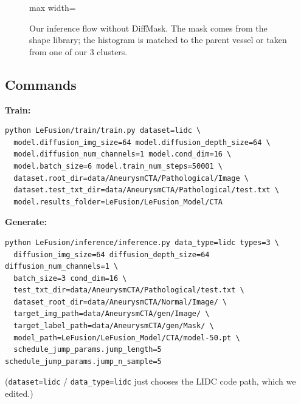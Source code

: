 \documentclass[11pt,a4paper]{article}
\newcommand{\x}{\bm{x}}
\begin{document}
\begin{figure}[H]
\begin{adjustbox}{max width=\linewidth}
\end{adjustbox}
\caption{Our inference flow without DiffMask. The mask comes from the shape library; the histogram is matched to the parent vessel or taken from one of our 3 clusters.}
\end{figure}


\subsection{Commands}
\textbf{Train:}
\begin{verbatim}
python LeFusion/train/train.py dataset=lidc \
  model.diffusion_img_size=64 model.diffusion_depth_size=64 \
  model.diffusion_num_channels=1 model.cond_dim=16 \
  model.batch_size=6 model.train_num_steps=50001 \
  dataset.root_dir=data/AneurysmCTA/Pathological/Image \
  dataset.test_txt_dir=data/AneurysmCTA/Pathological/test.txt \
  model.results_folder=LeFusion/LeFusion_Model/CTA
\end{verbatim}
\textbf{Generate:}
\begin{verbatim}
python LeFusion/inference/inference.py data_type=lidc types=3 \
  diffusion_img_size=64 diffusion_depth_size=64 diffusion_num_channels=1 \
  batch_size=3 cond_dim=16 \
  test_txt_dir=data/AneurysmCTA/Pathological/test.txt \
  dataset_root_dir=data/AneurysmCTA/Normal/Image/ \
  target_img_path=data/AneurysmCTA/gen/Image/ \
  target_label_path=data/AneurysmCTA/gen/Mask/ \
  model_path=LeFusion/LeFusion_Model/CTA/model-50.pt \
  schedule_jump_params.jump_length=5 schedule_jump_params.jump_n_sample=5
\end{verbatim}
(\texttt{dataset=lidc} / \texttt{data\_type=lidc} just chooses the LIDC code path, which we edited.)
\end{document}
